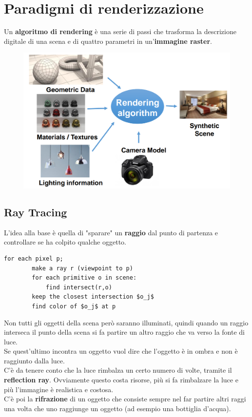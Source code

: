 \newpage

\section{Paradigmi di renderizzazione}
Un \textbf{algoritmo di rendering} è una serie di passi che trasforma la descrizione digitale di una scena e di quattro parametri in un'\textbf{immagine raster}.\\
\begin{figure}[h]
	\includegraphics[scale=0.25]{rendering_algorithm.png}
	\centering
\end{figure}

\subsection{Ray Tracing}
L'idea alla base è quella di "sparare" un \textbf{raggio} dal punto di partenza e controllare se ha colpito qualche oggetto.
\begin{lstlisting}[mathescape=true]
	for each pixel p;
		make a ray r (viewpoint to p)
		for each primitive o in scene:
			find intersect(r,o)
		keep the closest intersection $o_j$
		find color of $o_j$ at p
\end{lstlisting}
Non tutti gli oggetti della scena però saranno illuminati, quindi quando un raggio interseca il punto della scena si fa partire un altro raggio che va verso la fonte di luce.\\
Se quest'ultimo incontra un oggetto vuol dire che l'oggetto è in ombra e non è raggiunto dalla luce.\\
C'è da tenere conto che la luce rimbalza un certo numero di volte, tramite il \textbf{reflection ray}. Ovviamente questo costa risorse, più si fa rimbalzare la luce e più l'immagine è realistica e costosa.\\
C'è poi la \textbf{rifrazione} di un oggetto che consiste sempre nel far partire altri raggi una volta che uno raggiunge un oggetto (ad esempio una bottiglia d'acqua).

